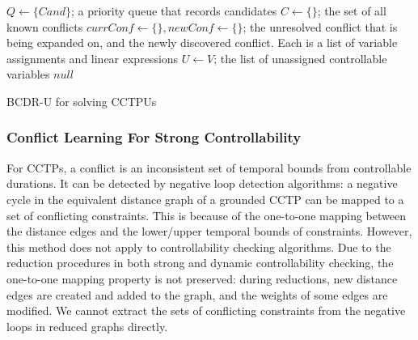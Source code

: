 \documentclass[jair,twoside,11pt,theapa]{article}
\begin{document}
\begin{algorithm}[htb!]
	\SetAlgoLined
	\Indm
	\Initialize{}
	\;
	{$Q\leftarrow\{\mathit{Cand}\}$; a priority queue that records candidates}\;
	{$C\leftarrow\{\}$; the set of all known conflicts}\;
	{$\mathit{currConf}\leftarrow \{\}, \mathit{newConf}\leftarrow \{\}$; the unresolved conflict that is being expanded on, and the newly discovered conflict. Each is a list of variable assignments and linear expressions}\;
	{$U\leftarrow V$; the list of unassigned controllable variables}\;
	\Indm
	\Algorithm{}
	\Indp
\Return $null$\;
\caption{BCDR-U for solving CCTPUs}
\label{alg:bcdr_controllability}
\end{algorithm}


\subsubsection{Conflict Learning For Strong Controllability}


For CCTPs, a conflict is an inconsistent set of temporal bounds from controllable durations. It can
be detected by negative loop detection algorithms: a negative cycle in the
equivalent distance graph of a grounded CCTP can be mapped to a set of
conflicting constraints. This is because of the one-to-one mapping between the
distance edges and the lower/upper temporal bounds of constraints. However, this
method does not apply to controllability checking algorithms. Due to the
reduction procedures in both strong and dynamic controllability checking, the one-to-one mapping property is not preserved: during reductions,
new distance edges are created and added to the graph, and the weights of some
edges are modified. We cannot extract the sets of conflicting constraints from
the negative loops in reduced graphs directly.
\end{document}
